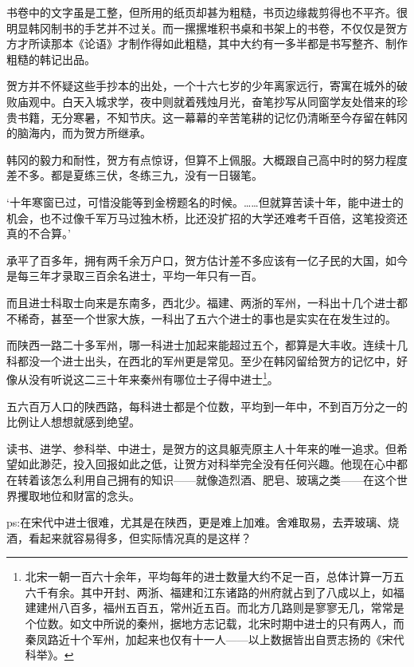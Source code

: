 书卷中的文字虽是工整，但所用的纸页却甚为粗糙，书页边缘裁剪得也不平齐。很明显韩冈制书的手艺并不过关。而一摞摞堆积书桌和书架上的书卷，不仅仅是贺方方才所读那本《论语》才制作得如此粗糙，其中大约有一多半都是书写整齐、制作粗糙的韩记出品。

贺方并不怀疑这些手抄本的出处，一个十六七岁的少年离家远行，寄寓在城外的破败庙观中。白天入城求学，夜中则就着残烛月光，奋笔抄写从同窗学友处借来的珍贵书籍，无分寒暑，不知节庆。这一幕幕的辛苦笔耕的记忆仍清晰至今存留在韩冈的脑海内，而为贺方所继承。

韩冈的毅力和耐性，贺方有点惊讶，但算不上佩服。大概跟自己高中时的努力程度差不多。都是夏练三伏，冬练三九，没有一日辍笔。

‘十年寒窗已过，可惜没能等到金榜题名的时候。……但就算苦读十年，能中进士的机会，也不过像千军万马过独木桥，比还没扩招的大学还难考千百倍，这笔投资还真的不合算。’

承平了百多年，拥有两千余万户口，贺方估计差不多应该有一亿子民的大国，如今是每三年才录取三百余名进士，平均一年只有一百。

而且进士科取士向来是东南多，西北少。福建、两浙的军州，一科出十几个进士都不稀奇，甚至一个世家大族，一科出了五六个进士的事也是实实在在发生过的。

而陕西一路二十多军州，哪一科进士加起来能超过五个，都算是大丰收。连续十几科都没一个进士出头，在西北的军州更是常见。至少在韩冈留给贺方的记忆中，好像从没有听说这二三十年来秦州有哪位士子得中进士\footnote{北宋一朝一百六十余年，平均每年的进士数量大约不足一百，总体计算一万五六千有余。其中开封、两浙、福建和江东诸路的州府就占到了八成以上，如福建建州八百多，福州五百五，常州近五百。而北方几路则是寥寥无几，常常是个位数。如文中所说的秦州，据地方志记载，北宋时期中进士的只有两人，而秦凤路近十个军州，加起来也仅有十一人——以上数据皆出自贾志扬的《宋代科举》。}。

五六百万人口的陕西路，每科进士都是个位数，平均到一年中，不到百万分之一的比例让人想想就感到绝望。

读书、进学、参科举、中进士，是贺方的这具躯壳原主人十年来的唯一追求。但希望如此渺茫，投入回报如此之低，让贺方对科举完全没有任何兴趣。他现在心中都在转着该怎么利用自己拥有的知识——就像造烈酒、肥皂、玻璃之类——在这个世界攫取地位和财富的念头。

ps:在宋代中进士很难，尤其是在陕西，更是难上加难。舍难取易，去弄玻璃、烧酒，看起来就容易得多，但实际情况真的是这样？